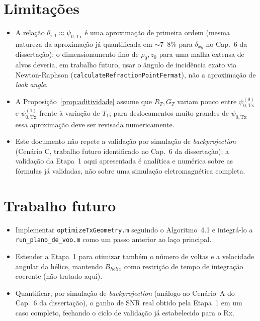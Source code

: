 \documentclass[12pt,a4paper,oneside]{book}
\theoremstyle{definition}
\theoremstyle{remark}
\newcommand{\RT}{R_T}
\newcommand{\dxy}{\delta_{xy}}
\newcommand{\psiT}{\psi_{0,\mathrm{Tx}}}
\begin{document}
\section{Limitações}

\begin{itemize}
  \item A relação $\theta_{i,1}\approx\psiT$ é uma aproximação de
  primeira ordem (mesma natureza da aproximação já quantificada em
  $\sim\!7$--$8\%$ para $\dxy$ no Cap.~6 da dissertação); o dimensionamento
  fino de $\rho_0,z_0$ para uma malha extensa de alvos deveria, em
  trabalho futuro, usar o ângulo de incidência exato via Newton-Raphson
  (\texttt{calculateRefractionPointFermat}), não a aproximação de
  \textit{look angle}.
  \item A Proposição~\ref{prop:aditividade} assume que $\RT,G_T$ variam
  pouco entre $\psiT^{(0)}$ e $\psiT^{(1)}$ frente à variação de $T_1$;
  para deslocamentos muito grandes de $\psiT$ essa aproximação deve ser
  revisada numericamente.
  \item Este documento não repete a validação por simulação de
  \textit{backprojection} (Cenário C, trabalho futuro identificado no
  Cap.~6 da dissertação); a validação da Etapa~1 aqui apresentada é
  analítica e numérica sobre as fórmulas já validadas, não sobre uma
  simulação eletromagnética completa.
\end{itemize}

\section{Trabalho futuro}

\begin{itemize}
  \item Implementar \texttt{optimizeTxGeometry.m} seguindo o
  Algoritmo~4.1 e integrá-lo a \texttt{run\_plano\_de\_voo.m} como um
  passo anterior ao laço principal.
  \item Estender a Etapa~1 para otimizar também o número de voltas e a
  velocidade angular da hélice, mantendo $B_{helix}$ como restrição de
  tempo de integração coerente (não tratado aqui).
  \item Quantificar, por simulação de \textit{backprojection}
  (análogo ao Cenário~A do Cap.~6 da dissertação), o ganho de SNR real
  obtido pela Etapa~1 em um caso completo, fechando o ciclo de validação
  já estabelecido para o Rx.
\end{itemize}
\end{document}
